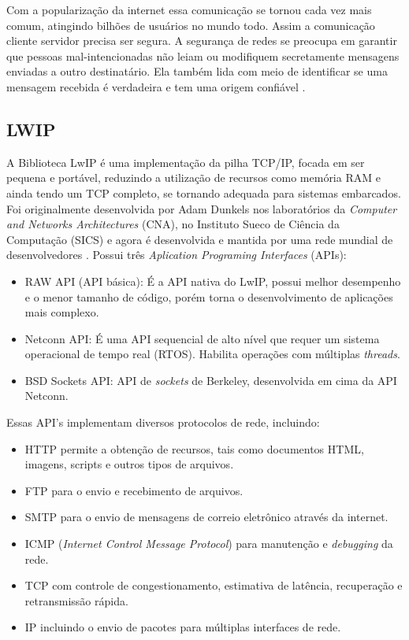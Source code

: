 Com a popularização da internet essa comunicação se tornou cada vez mais comum, atingindo bilhões de usuários no mundo todo. Assim a comunicação cliente servidor precisa ser segura. A segurança de redes se preocupa em garantir que pessoas mal-intencionadas não leiam ou modifiquem secretamente mensagens enviadas a outro destinatário. Ela também lida com meio de identificar se uma mensagem recebida é verdadeira e tem uma origem confiável \cite{tanenbaumRedes}.



\subsection{LWIP}
A Biblioteca LwIP é uma implementação da pilha TCP/IP, focada em ser pequena e portável, reduzindo a utilização de recursos como memória RAM e ainda tendo um TCP completo, se tornando adequada para sistemas embarcados. Foi originalmente desenvolvida por Adam Dunkels nos laboratórios da \textit{Computer and Networks Architectures} (CNA), no Instituto Sueco de Ciência da Computação (SICS) e agora é desenvolvida e mantida por uma rede mundial de desenvolvedores \cite{LWIP}.
Possui três \textit{Aplication Programing Interfaces} (APIs):
\begin{itemize}
\item RAW API (API básica): É a API nativa do LwIP, possui melhor desempenho e o menor tamanho de código, porém torna o desenvolvimento de aplicações mais complexo.
\item Netconn API: É uma API sequencial de alto nível que requer um sistema operacional de tempo real (RTOS). Habilita operações com múltiplas \textit{threads}.
\item BSD Sockets API: API de \textit{sockets} de Berkeley, desenvolvida em cima da API Netconn.
\end{itemize}

Essas API's implementam diversos protocolos de rede, incluindo:
\begin{itemize}
    \item HTTP permite a obtenção de recursos, tais como documentos HTML, imagens, scripts e outros tipos de arquivos.
    \item FTP para o envio e recebimento de arquivos.
    \item SMTP para o envio de mensagens de correio eletrônico através da internet.
    \item ICMP (\textit{Internet Control Message Protocol}) para manutenção e \textit{debugging} da rede.
    \item TCP com controle de congestionamento, estimativa de latência, recuperação e retransmissão rápida.
    \item IP incluindo o envio de pacotes para múltiplas interfaces de rede. \newline
    
 
    
\end{itemize} 

